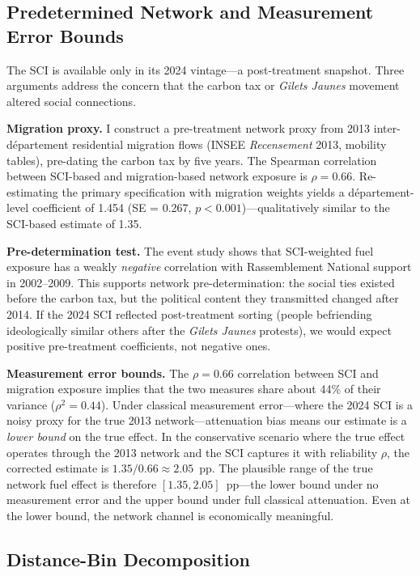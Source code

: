 \documentclass[12pt]{article}
\newcommand{\rn}{Rassemblement National}
\newcommand{\gj}{\textit{Gilets Jaunes}}
\newcommand{\dept}{d\'{e}partement}
\begin{document}
\subsection{Predetermined Network and Measurement Error Bounds}
\label{sec:predetermined}

The SCI is available only in its 2024 vintage---a post-treatment snapshot. Three arguments address the concern that the carbon tax or \gj{} movement altered social connections.

\textbf{Migration proxy.} I construct a pre-treatment network proxy from 2013 inter-\dept{} residential migration flows (INSEE \textit{Recensement} 2013, mobility tables), pre-dating the carbon tax by five years. The Spearman correlation between SCI-based and migration-based network exposure is $\rho = 0.66$. Re-estimating the primary specification with migration weights yields a \dept{}-level coefficient of 1.454 (SE = 0.267, $p < 0.001$)---qualitatively similar to the SCI-based estimate of 1.35.

\textbf{Pre-determination test.} The event study shows that SCI-weighted fuel exposure has a weakly \emph{negative} correlation with \rn{} support in 2002--2009. This supports network pre-determination: the social ties existed before the carbon tax, but the political content they transmitted changed after 2014. If the 2024 SCI reflected post-treatment sorting (people befriending ideologically similar others after the \gj{} protests), we would expect positive pre-treatment coefficients, not negative ones.

\textbf{Measurement error bounds.} The $\rho = 0.66$ correlation between SCI and migration exposure implies that the two measures share about 44\% of their variance ($\rho^2 = 0.44$). Under classical measurement error---where the 2024 SCI is a noisy proxy for the true 2013 network---attenuation bias means our estimate is a \emph{lower bound} on the true effect. In the conservative scenario where the true effect operates through the 2013 network and the SCI captures it with reliability $\rho$, the corrected estimate is $1.35 / 0.66 \approx 2.05$~pp. The plausible range of the true network fuel effect is therefore $[1.35, 2.05]$~pp---the lower bound under no measurement error and the upper bound under full classical attenuation. Even at the lower bound, the network channel is economically meaningful.

\subsection{Distance-Bin Decomposition}
\end{document}
